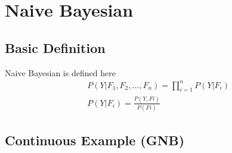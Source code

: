 \section{Naive Bayesian}
\subsection{Basic Definition}
Naive Bayesian is defined here
\begin{equation}
  \begin{aligned}
    &P(Y| F_1, F_2, ..., F_n) = \prod_{i=1}^n P(Y| F_i) \\
    &P(Y|F_i) = \frac{P(Y, Fi)}{P(Fi)}
  \end{aligned}
\end{equation}

\subsection{Continuous Example (GNB)}

